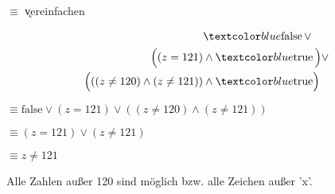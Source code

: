 \documentclass{bschlangaul-aufgabe}
\begin{document}
\begin{liAntwort}
$\equiv$ \k{vereinfachen}

\begin{align*}
& \m{\text{false}} \, \lor\\
\Bigl( (z = 121) & \land \m{\text{true}} \, \Bigr) \lor \\
\Bigl( ((z \neq 120) \land (z \neq 121)) & \land  \m{\text{true}} \Bigr) \\
\end{align*}

$\equiv \text{false} \lor (z = 121) \lor ((z \neq 120) \land (z \neq 121))$

$\equiv (z = 121) \lor (z \neq 121)$

$\equiv z \neq 121$

Alle Zahlen außer 120 sind möglich bzw. alle Zeichen außer ’x’.
\end{liAntwort}
\end{document}
